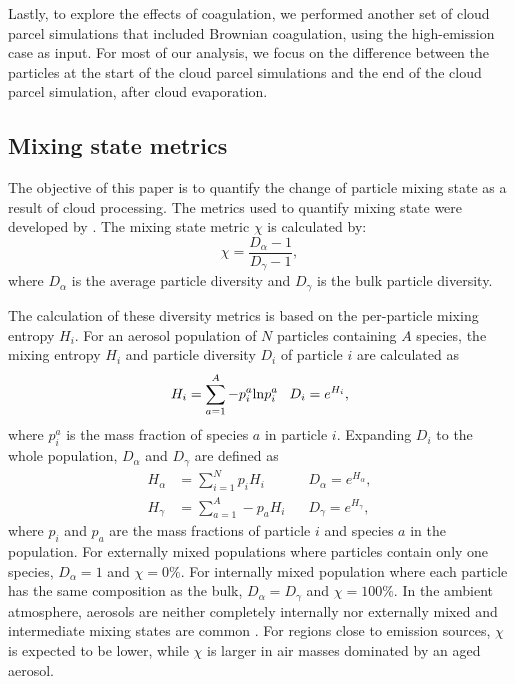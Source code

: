 \documentclass[edeposit,fullpage]{uiucthesis2009}
\begin{document}
Lastly, to explore the effects of coagulation, we performed another
set of cloud parcel simulations that included Brownian coagulation,
using the high-emission case as input. For most of our
analysis, we focus on the difference between the particles at the
start of the cloud parcel simulations and the end of the cloud parcel
simulation, after cloud evaporation.

\subsection{Mixing state metrics}
\label{sec:mixing_state_metrics}
The objective of this paper is to quantify the change of particle
mixing state as a result of cloud processing. The metrics used to
quantify mixing state were developed by \citet{Riemer2013a}. The
mixing state metric $\chi$ is calculated by:
\begin{equation} \label{eq:chi}
    \chi = \frac{{D}_{\alpha}-1}{{D}_{\gamma}-1},
\end{equation}
where $D_{\alpha}$ is the average particle diversity and
$D_{\gamma}$ is the bulk particle diversity.

The calculation of these diversity metrics is based on the
per-particle mixing entropy $H_i$. For an aerosol population of $N$
particles containing $A$ species, the mixing entropy $H_i$ and
particle diversity $D_i$ of particle $i$ are calculated as
\begin{equation}\label{eq:H-i}
    H_i = \sum_{a=1}^{A}-p_i^a {\rm ln}p_i^a  \;\;\;D_i = e^{H_i}, 
\end{equation}
where $p_i^a$ is the mass fraction of species $a$ in particle
$i$. Expanding $D_i$ to the whole population, $D_\alpha$ and
$D_{\gamma}$ are defined as
  \begin{align}
    H_\alpha &= \sum_{i=1}^N p_i H_i\;\;\;&D_\alpha= e^{H_\alpha}, \label{eq:H-alpha}\\
    H_\gamma &= \sum_{a=1}^A -p_a H_i\;\;\;&D_\gamma= e^{H_\gamma}, \label{eq:H-gamma}
  \end{align}
where $p_i$ and $p_a$ are the mass fractions of particle $i$ and
species $a$ in the population. For externally mixed populations where
particles contain only one species, $D_\alpha =1$ and $\chi =0\%$. For
internally mixed population where each particle has the same
composition as the bulk, $D_\alpha = D_\gamma $ and $\chi =100\%$. In
the ambient atmosphere, aerosols are neither completely internally nor
externally mixed and intermediate mixing states are common
\citep{Healy2014,Ye2018,Ching2019}. For regions close to emission
sources, $\chi$ is expected to be lower, while $\chi$ is larger in air
masses dominated by an aged aerosol. 
\end{document}
